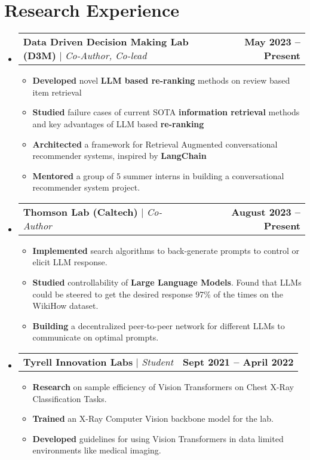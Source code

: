 \documentclass[letterpaper,11pt]{article}
\makeatletter
\newcommand{\resumeItem}[1]{
  \item\small{
    {#1 \vspace{-2pt}}
  }
}
\newcommand{\resumeProjectHeading}[2]{
    \item
    \begin{tabular*}{1.001\textwidth}{l@{\extracolsep{\fill}}r}
      \small#1 & \textbf{\small #2}\\
    \end{tabular*}\vspace{-7pt}
}
\newcommand{\resumeSubHeadingListStart}{\begin{itemize}[leftmargin=0.0in, label={}]}
\newcommand{\resumeSubHeadingListEnd}{\end{itemize}}
\newcommand{\resumeItemListStart}{\begin{itemize}}
\newcommand{\resumeItemListEnd}{\end{itemize}\vspace{-5pt}}
\makeatother
\begin{document}
\section{Research Experience}
    \vspace{-5pt}
    \resumeSubHeadingListStart
      \resumeProjectHeading
          {\textbf{Data Driven Decision Making Lab (D3M)} $|$ \emph{Co-Author, Co-lead}}{May 2023 -- Present}
        \resumeItemListStart
            \resumeItem{\textbf{Developed} novel \textbf{LLM based re-ranking} methods on review based item retrieval}
            \resumeItem{\textbf{Studied} failure cases of current SOTA \textbf{information retrieval} methods and key advantages of LLM based \textbf{re-ranking}}
            \resumeItem{\textbf{Architected} a framework for Retrieval Augmented conversational recommender systems, inspired by \textbf{LangChain}}
            \resumeItem{\textbf{Mentored} a group of 5 summer interns in building a conversational recommender system project.}
        \resumeItemListEnd
      \vspace{-20pt}
      \resumeProjectHeading
          {\textbf{Thomson Lab (Caltech)} $|$ \emph{Co-Author}}{August 2023 -- Present}
        \resumeItemListStart
            \resumeItem{\textbf{Implemented} search algorithms to back-generate prompts to control or elicit LLM response.}
            \resumeItem{\textbf{Studied} controllability of \textbf{Large Language Models}. Found that LLMs could be steered to get the desired response 97\% of the times on the WikiHow dataset.}
            \resumeItem{\textbf{Building} a decentralized peer-to-peer network for different LLMs to communicate on optimal prompts.}
        \resumeItemListEnd
      \vspace{-20pt}
      \resumeProjectHeading
          {\textbf{Tyrell Innovation Labs} $|$ \emph{Student}}{Sept 2021 -- April 2022}
        \resumeItemListStart
            \resumeItem{\textbf{Research} on sample efficiency of Vision Transformers on Chest X-Ray Classification Tasks.}
            \resumeItem{\textbf{Trained} an X-Ray Computer Vision backbone model for the lab.}
            \resumeItem{\textbf{Developed} guidelines for using Vision Transformers in data limited environments like medical imaging.}
        \resumeItemListEnd
    \resumeSubHeadingListEnd
\vspace{-15pt}

\end{document}
